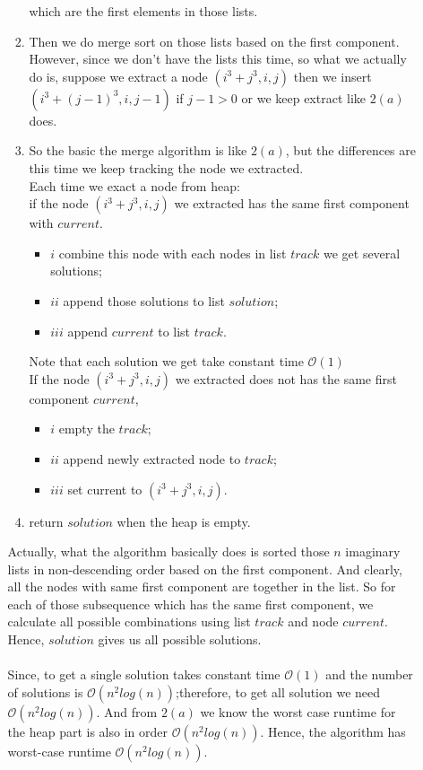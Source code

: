 \documentclass[11pt,twoside]{article}
\begin{document}
\begin{enumerate}[leftmargin=0pt]
\begin{enumerate}[topsep=0pt]
\begin{enumerate}
			which are the first elements in those lists.
			\item Then we do merge sort on those lists based on the first component. However, since we don't have the lists this time, so what we actually do is, suppose 
			we extract a node $(i^3 + j^3, i, j)$ then we insert $(i^3 + (j-1)^3, i, j-1)$ if $j-1>0$ or we keep extract like $2(a)$ does.
			\item So the basic the merge algorithm is like $2(a)$, but the differences are this time we keep tracking the node we extracted.\\
			Each time we exact a node from heap:\\ 
			if the node $(i^3 + j^3, i, j)$ we extracted  has the same first component  with $current$. \\
				\begin{itemize} [label={}]
					\item $i$ combine this node with each nodes in list $track$ we get several solutions;
					\item $ii$ append those solutions to list $solution$;
					\item $iii$ append $current$ to list $track$.\\
				\end{itemize}
			Note that each solution we get take constant time  $ \mathcal{O} (1)$\\
			If the node $(i^3 + j^3, i, j)$ we extracted  does not has the same first component $current$,
			\begin{itemize} [label={}]
				\item $i$ empty the $track$;
				\item $ii$ append newly extracted node to $track$;
				\item $iii$ set current to $(i^3 + j^3, i, j)$.
			\end{itemize}
			
			\item return $solution$ when the heap is empty.
			\end{enumerate}
			
			Actually, what the algorithm basically does is sorted those $n$ imaginary lists in non-descending order based on the first component.
			And clearly, all the nodes with same first component are together in the list. So for each of those subsequence which has the same first 
			component, we calculate all possible combinations using list $track$ and node $current$. Hence, $solution$ gives us all possible solutions.\\
			\\
			Since, to get a single solution takes constant time  $ \mathcal{O} (1)$ and the number of solutions  is  $ \mathcal{O} (n^2log(n))$;therefore, 
			to get all solution we need $ \mathcal{O} (n^2log(n))$. And from $2(a)$ we know the worst case runtime for the heap part is also in order 
			$ \mathcal{O} (n^2log(n))$. Hence, the algorithm has worst-case runtime $ \mathcal{O} (n^2log(n))$.
			

	\end{enumerate}


\end{enumerate}
\end{document}
